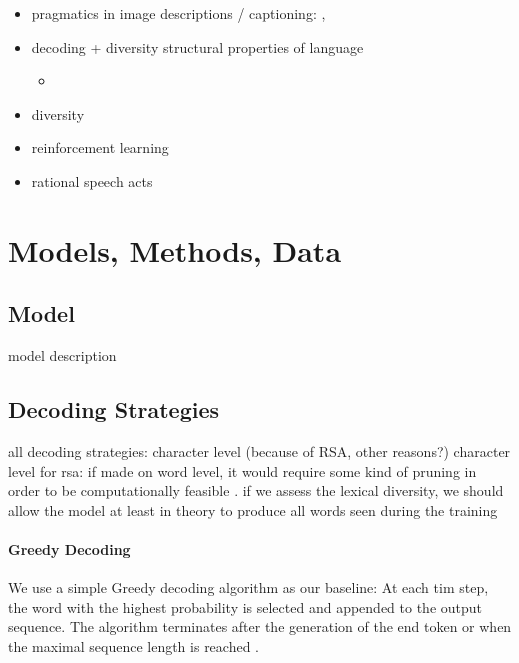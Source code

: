 \documentclass[11pt,a4paper]{article}
\begin{document}
\begin{itemize}
	\item pragmatics in image descriptions / captioning: \citet{Miltenburg2016}, \citet{Cohn-Gordon2018}
	\item decoding + diversity
	\citep{ippolito-etal-2019-comparison} \citep{Wang2019} \citep{van-miltenburg-etal-2018-measuring} structural properties of language \citep{ghodsi-denero-2016-analysis} \citep{Lippi2018}
	\begin{itemize}
		\item \citep{zarriess-schlangen-2018-decoding}
	\end{itemize}
	\item diversity
	\item reinforcement learning
	\item rational speech acts

\end{itemize}

\section{Models, Methods, Data}

\subsection{Model}

model description

\subsection{Decoding Strategies}

all decoding strategies: character level (because of RSA, other reasons?)
character level for rsa: if made on word level, it would require some kind of pruning in order to be computationally feasible \citep{Cohn-Gordon2018}. if we assess the lexical diversity, we should allow the model at least in theory to produce all words seen during the training

\paragraph{Greedy Decoding} We use a simple Greedy decoding algorithm as our baseline: At each tim step, the word with the highest probability is selected and appended to the output sequence. The algorithm terminates after the generation of the end token or when the maximal sequence length is reached \citep[cf. e.g.][]{zarriess-schlangen-2018-decoding}.
\end{document}
